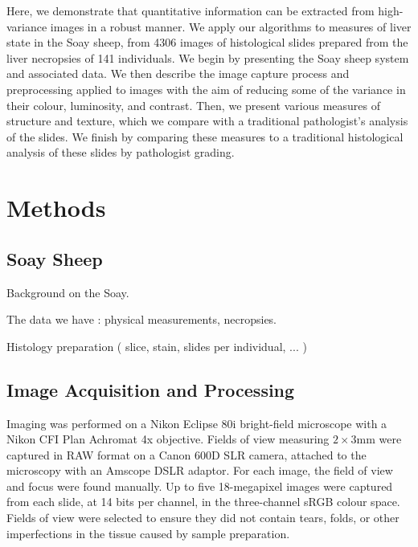 \documentclass[10pt]{article}
\begin{document}
Here, we demonstrate that quantitative information can be extracted from high-variance images in a robust manner. We apply our algorithms to measures of liver state in the Soay sheep, from 4306 images of histological slides prepared from the liver necropsies of 141 individuals. We begin by presenting the Soay sheep system and associated data. We then describe the image capture process and preprocessing applied to images with the aim of reducing some of the variance in their colour, luminosity, and contrast. Then, we present various measures of structure and texture, which we compare with a traditional pathologist's analysis of the slides. We finish by comparing these measures to a traditional histological analysis of these slides by pathologist grading.













\section*{Methods}


\subsection*{Soay Sheep}

Background on the Soay. 

The data we have : physical measurements, necropsies.

Histology preparation ( slice, stain, slides per individual, ... )







\subsection*{Image Acquisition and Processing}

Imaging was performed on a Nikon Eclipse 80i bright-field microscope with a Nikon CFI Plan Achromat 4x objective. Fields of view measuring $2\times3$mm were captured in RAW format on a Canon 600D SLR camera, attached to the microscopy with an Amscope DSLR adaptor. For each image, the field of view and focus were found manually. Up to five 18-megapixel images were captured from each slide, at 14 bits per channel, in the three-channel sRGB colour space. Fields of view were selected to ensure they did not contain tears, folds, or other imperfections in the tissue caused by sample preparation.
\end{document}
